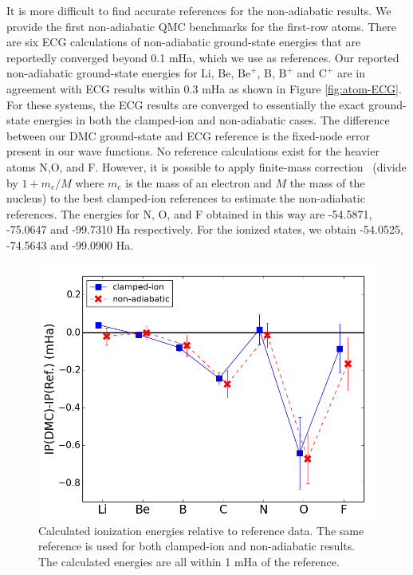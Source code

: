 \documentclass[pra,superscriptaddress,groupedaddress,twocolumn]{revtex4-1}
\begin{document}
It is more difficult to find accurate references for the non-adiabatic results. We provide the first non-adiabatic QMC benchmarks for the first-row atoms. There are six ECG calculations of non-adiabatic ground-state energies that are reportedly converged beyond 0.1 mHa, which we use as references. Our reported non-adiabatic ground-state energies for Li, Be, $\text{Be}^+$, B, $\text{B}^+$ and $\text{C}^+$ are in agreement with ECG results within 0.3 mHa as shown in Figure \ref{fig:atom-ECG}. For these systems, the ECG results are converged to essentially the exact ground-state energies in both the clamped-ion and non-adiabatic cases. The difference between our DMC ground-state and ECG reference is the fixed-node error present in our wave functions. No reference calculations exist for the heavier atoms N,O, and F. However, it is possible to apply finite-mass correction~\cite{Davidson_Atoms,Cencek_LiH} (divide by $1+m_e/M$ where $m_e$ is the mass of an electron and $M$ the mass of the nucleus) to the best clamped-ion references to estimate the non-adiabatic references. The energies for N, O, and F obtained in this way are -54.5871, -75.0647 and -99.7310 Ha respectively. For the ionized states, we obtain -54.0525, -74.5643 and -99.0900 Ha. %

\begin{figure}[h]
\centering
\includegraphics[scale=.4]{Figures/ionization}
\caption{Calculated ionization energies relative to reference data. The same reference is used for both clamped-ion and non-adiabatic results. The calculated energies are all within 1 mHa of the reference. \label{fig:ionization}}
\end{figure}
\end{document}
